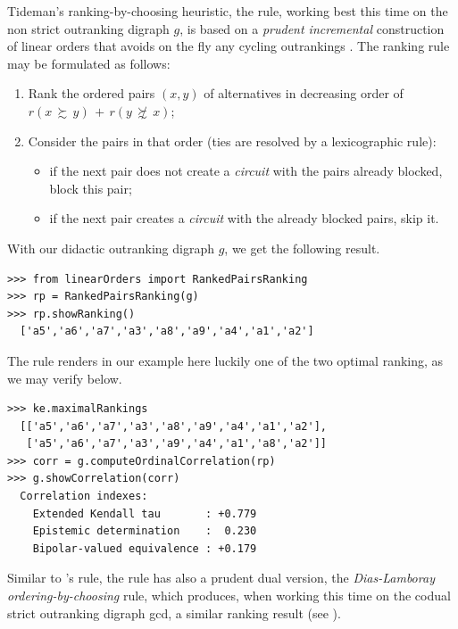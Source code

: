Tideman's  ranking-by-choosing heuristic, the \RankedPairs rule, working best this time on the non strict outranking digraph $g$, is based on a \emph{prudent incremental} construction of linear orders that avoids on the fly any cycling outrankings \citep{TID-1987}. The ranking rule may be formulated as follows:
\begin{definition}
\begin{enumerate}
 \item Rank the ordered pairs $(x,y)$ of alternatives in decreasing order of $r(x\, \succsim \,y) \,+\, r(y\, \not\succsim \,x)$;
 \item Consider the pairs in that order (ties are resolved by a lexicographic rule):
   \begin{itemize}
     \item if the next pair does not create a \emph{circuit} with the pairs already blocked, block this pair;
     \item if the next pair creates a \emph{circuit} with the already blocked pairs, skip it.
    \end{itemize}
\end{enumerate}
\end{definition}  
With our didactic outranking digraph $g$, we get the following result.
\begin{lstlisting}[caption={Computing a \RankedPairs ranking},label=list:8.15]   
>>> from linearOrders import RankedPairsRanking
>>> rp = RankedPairsRanking(g)
>>> rp.showRanking()
  ['a5','a6','a7','a3','a8','a9','a4','a1','a2']
\end{lstlisting}

The \RankedPairs rule renders in our example here luckily one of the two optimal \Kemeny ranking, as we may verify below.
 \begin{lstlisting}
>>> ke.maximalRankings
  [['a5','a6','a7','a3','a8','a9','a4','a1','a2'],
   ['a5','a6','a7','a3','a9','a4','a1','a8','a2']]
>>> corr = g.computeOrdinalCorrelation(rp)
>>> g.showCorrelation(corr)
  Correlation indexes:
    Extended Kendall tau       : +0.779
    Epistemic determination    :  0.230
    Bipolar-valued equivalence : +0.179
\end{lstlisting}

Similar to \Kohler 's rule, the \RankedPairs rule has also a prudent dual version, the \emph{Dias-Lamboray} \emph{ordering-by-choosing} rule, which produces, when working this time on the codual strict outranking digraph gcd, a similar ranking result (see \citet*{DIA-2010}).

